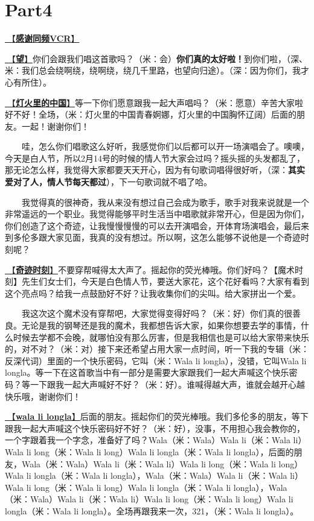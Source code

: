 \documentclass[]{ctexbook}
\begin{document}
\section{Part4}\label{Toronto-20250314-part4}

\hyperref[thank-you-vcr]{🎥【\textbf{感谢同频VCR}】}

\hyperref[Gaze]{🎵【\textbf{望}】}你们会跟我们唱这首歌吗？（米：会）\textbf{你们真的太好啦！}到你们啦，（深、米：我们总会绕啊绕，绕啊绕，绕几千里路，也望向归途）。（深：因为你们，我才心有所住）。

\hyperref[China-in-the-lights]{🎵【\textbf{灯火里的中国}】}等一下你们愿意跟我一起大声唱吗？（米：愿意）辛苦大家啦好不好！全场，（米：灯火里的中国青春婀娜，灯火里的中国胸怀辽阔）后面的朋友。一起！谢谢你们！

  哇，怎么你们唱歌这么好听，我感觉你们以后都可以开一场演唱会了。噢噢，今天是白人节，所以2月14号的时候的情人节大家会过吗？摇头摇的头发都乱了，那无论怎么样，我觉得大家都要天天开心，因为有句歌词唱得很好听，（深：\textbf{其实爱对了人，情人节每天都过}），下一句歌词就不唱了哈。

  我觉得真的很神奇，我从来没有想过自己会成为歌手，歌手对我来说就是一个非常遥远的一个职业。我觉得能够平时生活当中唱歌就非常开心，但是因为你们，你们创造了这个奇迹，让我慢慢慢慢的可以去开演唱会，开体育场演唱会，最后来到多伦多跟大家见面，我真的没有想过。所以啊，这怎么能够不说他是一个奇迹时刻呢？

\hyperref[magic-moment]{🎵【\textbf{奇迹时刻}】}不要穿帮喊得太大声了。摇起你的荧光棒哦。你们好吗？【魔术时刻】先生们女士们，今天是白色情人节，要送大家花，这个花好看吗？大家有看到这个亮点吗？给我一点鼓励好不好？让我收集你们的尖叫。给大家拼出一个爱。

  我这次这个魔术没有穿帮吧，大家觉得变得好吗？（米：好）你们真的很善良。无论是我的钢琴还是我的魔术，我都想告诉大家，如果你想要去学的事情，什么时候去学都不会晚，就哪怕没有那么厉害，但是我相信也是可以给大家带来快乐的，对不对？（米：对）接下来还希望占用大家一点时间，听一下我的专辑（米：反深代词）里面的一个快乐密码，它叫（米：Wala li longla），没错，它叫Wala li longla。等一下在这首歌当中有一部分是需要大家跟我们一起大声喊这个快乐密码？等一下跟我一起大声喊好不好？（米：好）。谁喊得越大声，谁就会越开心越快乐哦，谢谢你们！

\hyperref[wala-li-longla]{🎵【\textbf{wala li longla}】}后面的朋友。摇起你们的荧光棒哦。我们多伦多的朋友，等下跟我一起大声喊这个快乐密码好不好？（米：好），没事，不用担心我会教你的，一个字跟着我一个字念，准备好了吗？Wala（米：Wala）Wala li（米：Wala li）Wala li long（米：Wala li long）Wala li longla（米：Wala li longla），后面的朋友，Wala（米：Wala）Wala li（米：Wala li）Wala li long（米：Wala li long）Wala li longla（米：Wala li longla），Wala（米：Wala）Wala li（米：Wala li）Wala li long（米：Wala li long）Wala li longla（米：Wala li longla），Wala（米：Wala）Wala li（米：Wala li）Wala li long（米：Wala li long）Wala li longla（米：Wala li longla）。全场再跟我来一次，321，（米：Wala li longla）。
\end{document}
